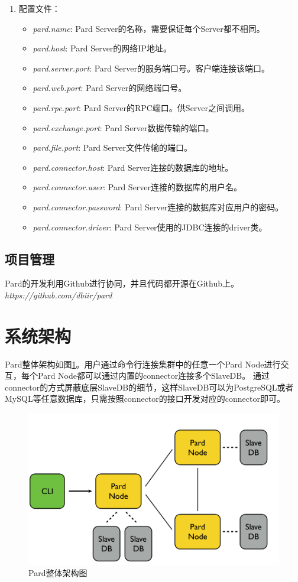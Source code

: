 \documentclass[a4paper, 12pt]{ctexart}
\begin{document}
\begin{enumerate}
\item 配置文件：
\begin{itemize}
\item \textit{pard.name}: Pard Server的名称，需要保证每个Server都不相同。
\item \textit{pard.host}: Pard Server的网络IP地址。
\item \textit{pard.server.port}: Pard Server的服务端口号。客户端连接该端口。
\item \textit{pard.web.port}: Pard Server的网络端口号。
\item \textit{pard.rpc.port}: Pard Server的RPC端口。供Server之间调用。
\item \textit{pard.exchange.port}: Pard Server数据传输的端口。
\item \textit{pard.file.port}: Pard Server文件传输的端口。
\item \textit{pard.connector.host}: Pard Server连接的数据库的地址。
\item \textit{pard.connector.user}: Pard Server连接的数据库的用户名。
\item \textit{pard.connector.password}: Pard Server连接的数据库对应用户的密码。
\item \textit{pard.connector.driver}: Pard Server使用的JDBC连接的driver类。
\end{itemize}
\end{enumerate}

\subsection{项目管理}
Pard的开发利用Github进行协同，并且代码都开源在Github上。\textit{https://github.com/dbiir/pard} 
 
\section{系统架构}
Pard整体架构如图\ref{fig:archi}。用户通过命令行连接集群中的任意一个Pard Node进行交互，每个Pard Node都可以通过内置的connector连接多个SlaveDB。
通过connector的方式屏蔽底层SlaveDB的细节，这样SlaveDB可以为PostgreSQL或者MySQL等任意数据库，只需按照connector的接口开发对应的connector即可。

\begin{figure}[htbp]
	\centering
	\includegraphics[width=\linewidth]{figure/architecture.png}
	\caption{Pard整体架构图}
	\label{fig:archi}
\end{figure}
\end{document}
